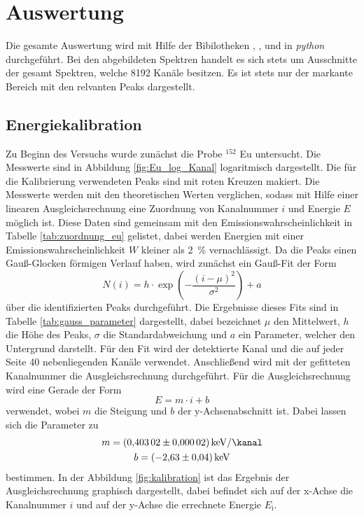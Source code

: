 \newpage
\section{Auswertung}
\label{sec:Auswertung}
Die gesamte Auswertung wird mit Hilfe der Bibilotheken \cite{matplotlib}, \cite{numpy}, \cite{scipy} und
\cite{uncertainties} in \textit{python} durchgeführt. Bei den abgebildeten Spektren handelt es sich stets um 
Ausschnitte der gesamt Spektren, welche \num{8192} Kanäle besitzen. Es ist stets nur der markante Bereich
mit den relvanten Peaks dargestellt.


\subsection{Energiekalibration}
\label{sec:Energiekalibration}
Zu Beginn des Versuchs wurde zunächst die Probe ${}^{152}$ Eu untersucht. Die Messwerte
sind in Abbildung \ref{fig:Eu_log_Kanal} logaritmisch dargestellt.
Die für die Kalibrierung verwendeten Peaks sind mit roten Kreuzen makiert. Die Messwerte
werden mit den theoretischen Werten \cite{referenz1} verglichen, sodass mit Hilfe einer linearen Ausgleichsrechnung
eine Zuordnung von Kanalnummer $i$ und Energie $E$ möglich ist. Diese Daten sind
gemeinsam mit den Emissionswahrscheinlichkeit in Tabelle \ref{tab:zuordnung_eu}
gelistet, dabei werden Energien mit einer Emissionswahrscheinlichkeit $W$
kleiner als \SI{2}{\percent} vernachlässigt.
Da die Peaks einen Gauß-Glocken förmigen Verlauf haben, wird zunächst ein Gauß-Fit der Form
\begin{equation}
  N(i) = h \cdot \exp{\left(-\frac{\left(i - \mu\right)^2}{\sigma^2}\right)} + a
\end{equation}
über die identifizierten Peaks durchgeführt. Die Ergebnisse dieses Fits sind in Tabelle \ref{tab:gauss_parameter}
dargestellt, dabei bezeichnet $\mu$ den Mittelwert, $h$ die Höhe des Peaks, $\sigma$ die Standardabweichung und 
$a$ ein Parameter, welcher den Untergrund darstellt. Für den Fit wird der detektierte Kanal und die auf jeder Seite 
\num{40} nebenliegenden Kanäle verwendet. Anschließend wird mit der gefitteten Kanalnummer die Ausgleichsrechnung
durchgeführt. Für die Ausgleichsrechnung wird eine Gerade der Form
\begin{equation}
  E = m \cdot i + b
\end{equation}
verwendet, wobei $m$ die Steigung und $b$ der y-Achsenabschnitt ist. Dabei lassen sich die Parameter zu
\begin{gather*}
  m = \SI{0.40302(2)}{\kilo\electronvolt\per\kanal} \\
  b = \SI{-2.63(4)}{\kilo\electronvolt}
\end{gather*}
bestimmen.
In der Abbildung \ref{fig:kalibration} ist das Ergebnis der Ausgleichsrechnung graphisch
dargestellt, dabei befindet sich auf der x-Achse die Kanalnummer $i$ und auf der
y-Achse die errechnete Energie $E_\text{i}$.


